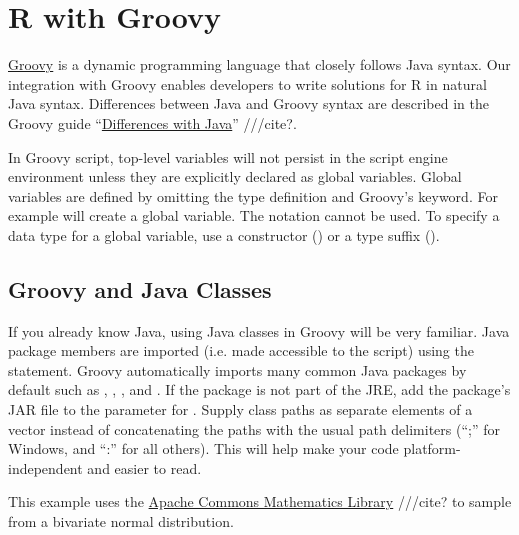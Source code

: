 \section{R with Groovy}

\href{http://www.groovy-lang.org/}{Groovy} is a dynamic programming language that closely follows Java syntax. Our integration with Groovy enables developers to write solutions for R in natural Java syntax. Differences between Java and Groovy syntax are described in the Groovy guide “\href{http://groovy-lang.org/differences.html}{Differences with Java}” ///cite?.

 In Groovy script, top-level variables will not persist in the script engine environment unless they are explicitly declared as global variables. Global variables are defined by omitting the type definition and Groovy's  keyword. For example  will create a global variable. The  notation cannot be used. To specify a data type for a global variable, use a constructor () or a type suffix ().

\subsection{Groovy and Java Classes}

If you already know Java, using Java classes in Groovy will be very familiar. Java package members are imported (i.e. made accessible to the script) using the  statement. Groovy automatically imports many common Java packages by default such as , , , and . If the package is not part of the JRE, add the package's JAR file to the  parameter for .  Supply class paths as separate elements of a vector instead of concatenating the paths with the usual path delimiters (“;” for Windows, and “:” for all others). This will help make your code platform-independent and easier to read.

This example uses the \href{http://commons.apache.org/proper/commons-math/}{Apache Commons Mathematics Library} ///cite? to sample from a bivariate normal distribution.

